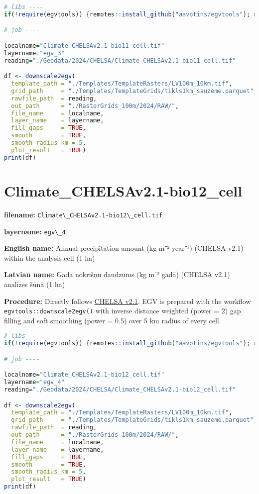 \documentclass[
]{book}
\newcommand{\passthrough}[1]{#1}
\begin{document}
\begin{lstlisting}[language=R]
# libs ----
if(!require(egvtools)) {remotes::install_github("aavotins/egvtools"); require(egvtools)}

# job ----

localname="Climate_CHELSAv2.1-bio11_cell.tif"
layername="egv_3"
reading="./Geodata/2024/CHELSA/Climate_CHELSAv2.1-bio11_cell.tif"

df <- downscale2egv(
  template_path = "./Templates/TemplateRasters/LV100m_10km.tif",
  grid_path     = "./Templates/TemplateGrids/tikls1km_sauzeme.parquet",
  rawfile_path  = reading,
  out_path      = "./RasterGrids_100m/2024/RAW/",
  file_name     = localname,
  layer_name    = layername,
  fill_gaps     = TRUE,
  smooth        = TRUE,
  smooth_radius_km = 5,
  plot_result   = TRUE)
print(df)
\end{lstlisting}

\section{Climate\_CHELSAv2.1-bio12\_cell}\label{ch06.004}

\textbf{filename:} \passthrough{\lstinline!Climate\_CHELSAv2.1-bio12\_cell.tif!}

\textbf{layername:} \passthrough{\lstinline!egv\_4!}

\textbf{English name:} Annual precipitation amount (kg m⁻² year⁻¹) (CHELSA v2.1) within the analysis cell (1 ha)

\textbf{Latvian name:} Gada nokrišņu daudzums (kg m⁻² gadā) (CHELSA v2.1) analīzes šūnā (1 ha)

\textbf{Procedure:} Directly follows \hyperref[Ch04.11]{CHELSA v2.1}. EGV is prepared with the
workflow \passthrough{\lstinline!egvtools::downscale2egv()!} with inverse distance weighted (power = 2)
gap filling and soft smoothing (power = 0.5) over 5 km radius of every cell.

\begin{lstlisting}[language=R]
# libs ----
if(!require(egvtools)) {remotes::install_github("aavotins/egvtools"); require(egvtools)}

# job ----

localname="Climate_CHELSAv2.1-bio12_cell.tif"
layername="egv_4"
reading="./Geodata/2024/CHELSA/Climate_CHELSAv2.1-bio12_cell.tif"

df <- downscale2egv(
  template_path = "./Templates/TemplateRasters/LV100m_10km.tif",
  grid_path     = "./Templates/TemplateGrids/tikls1km_sauzeme.parquet",
  rawfile_path  = reading,
  out_path      = "./RasterGrids_100m/2024/RAW/",
  file_name     = localname,
  layer_name    = layername,
  fill_gaps     = TRUE,
  smooth        = TRUE,
  smooth_radius_km = 5,
  plot_result   = TRUE)
print(df)
\end{lstlisting}
\end{document}
